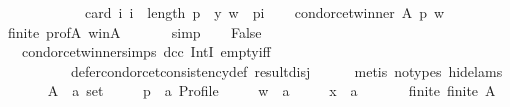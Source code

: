 \begin{isabellebody}
\ \ \ \ \ \ \ \ \ \ \ \ card\ {\isacharbraceleft}{\kern0pt}i{\isachardot}{\kern0pt}\ i\ {\isacharless}{\kern0pt}\ length\ p\ {\isasymand}\ {\isacharparenleft}{\kern0pt}y{\isacharcomma}{\kern0pt}\ w{\isacharparenright}{\kern0pt}\ {\isasymin}\ {\isacharparenleft}{\kern0pt}p{\isacharbang}{\kern0pt}i{\isacharparenright}{\kern0pt}{\isacharbraceright}{\kern0pt}{\isachardoublequoteclose}\isanewline
\ \ \isamarkupfalse%
\ {\isachardoublequoteopen}condorcet{\isacharunderscore}{\kern0pt}winner\ A\ p\ w{\isachardoublequoteclose}\isanewline
\ \ \ \ \isamarkupfalse%
\ finite\ prof{\isacharunderscore}{\kern0pt}A\ w{\isacharunderscore}{\kern0pt}in{\isacharunderscore}{\kern0pt}A\ {\isachardoublequoteopen}{}{\isachardoublequoteclose}\isanewline
\ \ \ \ \isamarkupfalse%
\ simp\isanewline
\ \ \isamarkupfalse%
\ {\isachardoublequoteopen}False{\isachardoublequoteclose}\isanewline
\ \ \ \ \isamarkupfalse%
\ {\isachardoublequoteopen}{}{\isachardoublequoteclose}\ {\isachardoublequoteopen}{}{\isachardoublequoteclose}\ condorcet{\isacharunderscore}{\kern0pt}winner{\isachardot}{\kern0pt}simps\ dcc\ IntI\ empty{\isacharunderscore}{\kern0pt}iff\isanewline
\ \ \ \ \ \ \ \ \ \ defer{\isacharunderscore}{\kern0pt}condorcet{\isacharunderscore}{\kern0pt}consistency{\isacharunderscore}{\kern0pt}def\ result{\isacharunderscore}{\kern0pt}disj\isanewline
\ \ \ \ \isamarkupfalse%
\ {\isacharparenleft}{\kern0pt}metis\ {\isacharparenleft}{\kern0pt}no{\isacharunderscore}{\kern0pt}types{\isacharcomma}{\kern0pt}\ hide{\isacharunderscore}{\kern0pt}lams{\isacharparenright}{\kern0pt}{\isacharparenright}{\kern0pt}\isanewline
{}\isamarkupfalse%
\isanewline
\ \ \isamarkupfalse%
\isanewline
\ \ \ \ A\ {\isacharcolon}{\kern0pt}{\isacharcolon}{\kern0pt}\ {\isachardoublequoteopen}{\isacharprime}{\kern0pt}a\ set{\isachardoublequoteclose}\ \isanewline
\ \ \ \ p\ {\isacharcolon}{\kern0pt}{\isacharcolon}{\kern0pt}\ {\isachardoublequoteopen}{\isacharprime}{\kern0pt}a\ Profile{\isachardoublequoteclose}\ \isanewline
\ \ \ \ w\ {\isacharcolon}{\kern0pt}{\isacharcolon}{\kern0pt}\ {\isachardoublequoteopen}{\isacharprime}{\kern0pt}a{\isachardoublequoteclose}\ \isanewline
\ \ \ \ x\ {\isacharcolon}{\kern0pt}{\isacharcolon}{\kern0pt}\ {\isachardoublequoteopen}{\isacharprime}{\kern0pt}a{\isachardoublequoteclose}\isanewline
\ \ \isamarkupfalse%
\isanewline
\ \ \ \ finite{\isacharcolon}{\kern0pt}\ {\isachardoublequoteopen}finite\ A{\isachardoublequoteclose}\ \isanewline

\end{isabellebody}
